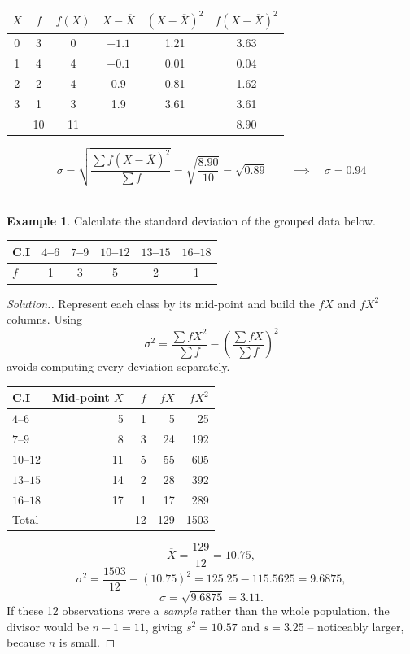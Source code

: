 \documentclass[11pt,a4paper]{article}
\theoremstyle{definition}
\newtheorem{example}[thm]{Example}
\newenvironment{solution}
  {\renewcommand{\qedsymbol}{}\begin{proof}[\textit{Solution}.]}
  {\end{proof}}
\begin{document}
\begin{enumerate}
\begin{table}[H]
\centering
\begin{tabular}{|c|c|c|c|c|c|}
\hline $X$& $f$ & $f(X)$&$X-\overline{X}$& $(X-\overline{X})^2$&$f(X-\overline{X})^2$\\
\hline 0&3&0&$-1.1$&1.21&3.63\\
1&4&4&$-0.1$&0.01&0.04\\
2&2&4&0.9&0.81&1.62\\
3&1&3&1.9&3.61&3.61\\
\hline &10&11&&&8.90\\
\hline
\end{tabular}
\end{table}

\[\sigma=\sqrt{\frac{\sum f(X-\overline{X})^2}{\sum f}}=\sqrt{\frac{8.90}{10}}=\sqrt{0.89}\qquad \implies\quad  \sigma =0.94\]\\





\begin{example}
Calculate the standard deviation of the grouped data below.
\begin{table}[H]
\centering
\begin{tabular}{lccccc}
C.I & $4$--$6$ & $7$--$9$ & $10$--$12$ & $13$--$15$ & $16$--$18$\\
\hline
$f$ & 1 & 3 & 5 & 2 & 1\\
\end{tabular}
\end{table}
\end{example}

\begin{solution}
Represent each class by its mid-point and build the $fX$ and $fX^2$ columns. Using
\[\sigma^2=\frac{\sum fX^2}{\sum f}-\left(\frac{\sum fX}{\sum f}\right)^{2}\]
avoids computing every deviation separately.
\begin{table}[H]
\centering
\begin{tabular}{lrrrr}
C.I & Mid-point $X$ & $f$ & $fX$ & $fX^2$\\
\hline
$4$--$6$   & 5  & 1  & 5   & 25\\
$7$--$9$   & 8  & 3  & 24  & 192\\
$10$--$12$ & 11 & 5  & 55  & 605\\
$13$--$15$ & 14 & 2  & 28  & 392\\
$16$--$18$ & 17 & 1  & 17  & 289\\
\hline
Total      &    & 12 & 129 & 1503\\
\end{tabular}
\end{table}
\[\overline{X}=\frac{129}{12}=10.75,\]
\[\sigma^2=\frac{1503}{12}-(10.75)^2=125.25-115.5625=9.6875,\]
\[\sigma=\sqrt{9.6875}=3.11.\]
If these 12 observations were a \emph{sample} rather than the whole population, the divisor
would be $n-1=11$, giving $s^2=10.57$ and $s=3.25$ -- noticeably larger, because $n$ is
small.
\end{solution}
\end{enumerate}
\end{document}
